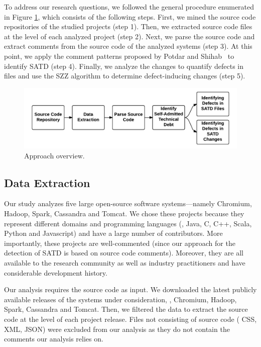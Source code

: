 To address our research questions, we followed the general procedure enumerated in Figure \ref{fig:Process_overview}, which consists of the following steps. First, we mined the source code repositories of the studied projects (step 1). Then, we extracted  source code files at the level of each analyzed project (step 2). Next, we parse the source code and extract comments from the source code of the analyzed systems (step 3). At this point, we apply the comment patterns proposed by Potdar and Shihab~\cite{ICSM_PotdarS14} to identify SATD (step 4). Finally, we analyze the changes to quantify defects in files and use the SZZ algorithm to determine defect-inducing changes (step 5).


\begin{figure}[t]
	\centering
	\includegraphics[width=150mm]{figures/chapter3/approach}
	\caption{Approach overview.}
	\label{fig:Process_overview}
\end{figure}


\subsection{Data Extraction}
Our study analyzes five large open-source software systems---namely Chromium, Hadoop, Spark, Cassandra and Tomcat. We chose these projects because they represent different domains and programming languages (\ie{}, Java, C, C++,  Scala, Python and Javascript) and have a large number of contributors. More importantly, these projects are well-commented (since our approach for the detection of SATD is based on source code comments). Moreover, they are all available to the research community as well as industry practitioners and have considerable development history.

Our analysis requires the source code as input. We downloaded the latest publicly available releases of the systems under consideration, \ie{}, Chromium, Hadoop, Spark, Cassandra and Tomcat. Then, we filtered the data to extract the source code at the level of each project release. Files not consisting of source code (\eg{} CSS, XML, JSON) were excluded from our analysis as they do not contain the comments our analysis relies on.\\

